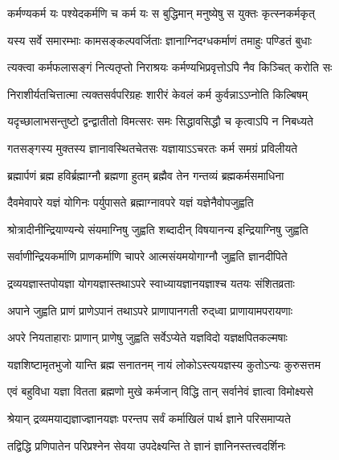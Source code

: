 \twolineshloka
{कर्मण्यकर्म यः पश्येदकर्मणि च कर्म यः}
{स बुद्धिमान् मनुष्येषु स युक्तः कृत्स्नकर्मकृत्}%

\twolineshloka
{यस्य सर्वे समारम्भाः कामसङ्कल्पवर्जिताः}
{ज्ञानाग्निदग्धकर्माणं तमाहुः पण्डितं बुधाः}%

\twolineshloka
{त्यक्त्वा कर्मफलासङ्गं नित्यतृप्तो निराश्रयः}
{कर्मण्यभिप्रवृत्तोऽपि नैव किञ्चित् करोति सः}%

\twolineshloka
{निराशीर्यतचित्तात्मा त्यक्तसर्वपरिग्रहः}
{शारीरं केवलं कर्म कुर्वन्नाऽऽप्नोति किल्बिषम्}%

\twolineshloka
{यदृच्छालाभसन्तुष्टो द्वन्द्वातीतो विमत्सरः}
{समः सिद्धावसिद्धौ च कृत्वाऽपि न निबध्यते}%

\twolineshloka
{गतसङ्गस्य मुक्तस्य ज्ञानावस्थितचेतसः}
{यज्ञायाऽऽचरतः कर्म समग्रं प्रविलीयते}%

\twolineshloka
{ब्रह्मार्पणं ब्रह्म हविर्ब्रह्माग्नौ ब्रह्मणा हुतम्}
{ब्रह्मैव तेन गन्तव्यं ब्रह्मकर्मसमाधिना}%

\twolineshloka
{दैवमेवापरे यज्ञं योगिनः पर्युपासते}
{ब्रह्माग्नावपरे यज्ञं यज्ञेनैवोपजुह्वति}%

\twolineshloka
{श्रोत्रादीनीन्द्रियाण्यन्ये संयमाग्निषु जुह्वति}
{शब्दादीन् विषयानन्य इन्द्रियाग्निषु जुह्वति}%

\twolineshloka
{सर्वाणीन्द्रियकर्माणि प्राणकर्माणि चापरे}
{आत्मसंयमयोगाग्नौ जुह्वति ज्ञानदीपिते}%

\twolineshloka
{द्रव्ययज्ञास्तपोयज्ञा योगयज्ञास्तथाऽपरे}
{स्वाध्यायज्ञानयज्ञाश्च यतयः संशितव्रताः}%

\twolineshloka
{अपाने जुह्वति प्राणं प्राणेऽपानं तथाऽपरे}
{प्राणापानगती रुद्‌ध्वा प्राणायामपरायणाः}%

\twolineshloka
{अपरे नियताहाराः प्राणान् प्राणेषु जुह्वति}
{सर्वेऽप्येते यज्ञविदो यज्ञक्षपितकल्मषाः}%

\twolineshloka
{यज्ञशिष्टामृतभुजो यान्ति ब्रह्म सनातनम्}
{नायं लोकोऽस्त्ययज्ञस्य कुतोऽन्यः कुरुसत्तम}%

\twolineshloka
{एवं बहुविधा यज्ञा वितता ब्रह्मणो मुखे}
{कर्मजान् विद्धि तान् सर्वानेवं ज्ञात्वा विमोक्ष्यसे}%

\twolineshloka
{श्रेयान् द्रव्यमयाद्यज्ञाज्ज्ञानयज्ञः परन्तप}
{सर्वं कर्माखिलं पार्थ ज्ञाने परिसमाप्यते}%

\twolineshloka
{तद्विद्धि प्रणिपातेन परिप्रश्नेन सेवया}
{उपदेक्ष्यन्ति ते ज्ञानं ज्ञानिनस्तत्त्वदर्शिनः}%

